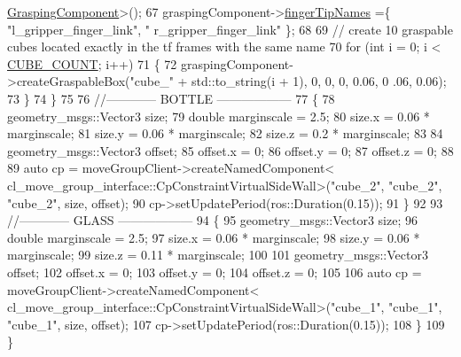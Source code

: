 \begin{DoxyCode}
      \hyperlink{classcl__move__group__interface_1_1GraspingComponent}{GraspingComponent}>();
67                 graspingComponent->\hyperlink{classcl__move__group__interface_1_1GraspingComponent_afc08a0abc3220a377d0bbf798383a42a}{fingerTipNames} =\{ \textcolor{stringliteral}{"l\_gripper\_finger\_link"}, \textcolor{stringliteral}{"
      r\_gripper\_finger\_link"} \};
68 
69                 \textcolor{comment}{// create 10 graspable cubes located exactly in the tf frames with the same name}
70                 \textcolor{keywordflow}{for} (\textcolor{keywordtype}{int} i = 0; i < \hyperlink{namespacesm__fetch__two__table__whiskey__pour_ab6321f5657e6b4b621a9b084f81bdeb6}{CUBE\_COUNT}; i++)
71                 \{
72                     graspingComponent->createGraspableBox(\textcolor{stringliteral}{"cube\_"} + std::to\_string(i + 1), 0, 0, 0, 0.06, 0
      .06, 0.06);
73                 \}
74             \}
75 
76             \textcolor{comment}{//------------ BOTTLE ------------------}
77             \{
78                 geometry\_msgs::Vector3 size;
79                 \textcolor{keywordtype}{double} marginscale = 2.5;
80                 size.x = 0.06 * marginscale;
81                 size.y = 0.06 * marginscale;
82                 size.z = 0.2 * marginscale;
83 
84                 geometry\_msgs::Vector3 offset;
85                 offset.x = 0;
86                 offset.y = 0;
87                 offset.z = 0;
88 
89                 \textcolor{keyword}{auto} cp = moveGroupClient->createNamedComponent<
      cl\_move\_group\_interface::CpConstraintVirtualSideWall>(\textcolor{stringliteral}{"cube\_2"}, \textcolor{stringliteral}{"cube\_2"}, \textcolor{stringliteral}{"cube\_2"}, size, offset);
90                 cp->setUpdatePeriod(ros::Duration(0.15));
91             \}
92 
93             \textcolor{comment}{//------------ GLASS ------------------}
94             \{
95                 geometry\_msgs::Vector3 size;
96                 \textcolor{keywordtype}{double} marginscale = 2.5;
97                 size.x = 0.06 * marginscale;
98                 size.y = 0.06 * marginscale;
99                 size.z = 0.11 * marginscale;
100 
101                 geometry\_msgs::Vector3 offset;
102                 offset.x = 0;
103                 offset.y = 0;
104                 offset.z = 0;
105 
106                 \textcolor{keyword}{auto} cp = moveGroupClient->createNamedComponent<
      cl\_move\_group\_interface::CpConstraintVirtualSideWall>(\textcolor{stringliteral}{"cube\_1"}, \textcolor{stringliteral}{"cube\_1"}, \textcolor{stringliteral}{"cube\_1"}, size, offset);
107                 cp->setUpdatePeriod(ros::Duration(0.15));
108             \}
109         \}
\end{DoxyCode}
